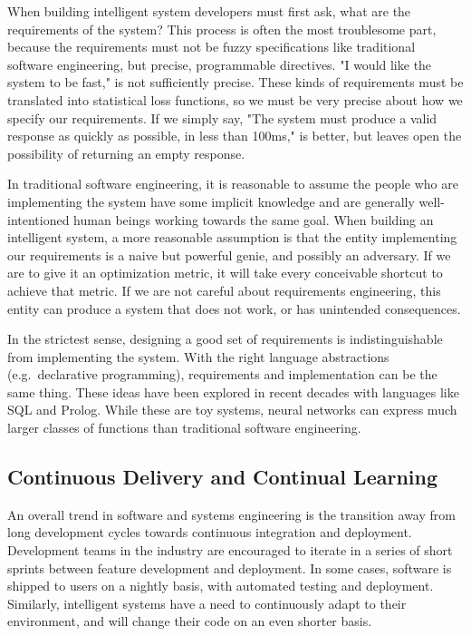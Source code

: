 \documentclass[12pt,initial,twoside,maitrise]{dms}
\numberwithin{equation}{section}
\numberwithin{table}{chapter}
\numberwithin{figure}{chapter}
\begin{document}
When building intelligent system developers must first ask, what are the requirements of the system? This process is often the most troublesome part, because the requirements must not be fuzzy specifications like traditional software engineering, but precise, programmable directives. "I would like the system to be fast," is not sufficiently precise. These kinds of requirements must be translated into statistical loss functions, so we must be very precise about how we specify our requirements. If we simply say, "The system must produce a valid response as quickly as possible, in less than 100ms," is better, but leaves open the possibility of returning an empty response.

In traditional software engineering, it is reasonable to assume the people who are implementing the system have some implicit knowledge and are generally well-intentioned human beings working towards the same goal. When building an intelligent system, a more reasonable assumption is that the entity implementing our requirements is a naive but powerful genie, and possibly an adversary. If we are to give it an optimization metric, it will take every conceivable shortcut to achieve that metric. If we are not careful about requirements engineering, this entity can produce a system that does not work, or has unintended consequences.

In the strictest sense, designing a good set of requirements is indistinguishable from implementing the system. With the right language abstractions (e.g.\ declarative programming), requirements and implementation can be the same thing. These ideas have been explored in recent decades with languages like SQL and Prolog. While these are toy systems, neural networks can express much larger classes of functions than traditional software engineering.

\subsection{Continuous Delivery and Continual Learning}

An overall trend in software and systems engineering is the transition away from long development cycles towards continuous integration and deployment. Development teams in the industry are encouraged to iterate in a series of short sprints between feature development and deployment. In some cases, software is shipped to users on a nightly basis, with automated testing and deployment. Similarly, intelligent systems have a need to continuously adapt to their environment, and will change their code on an even shorter basis.
\end{document}
